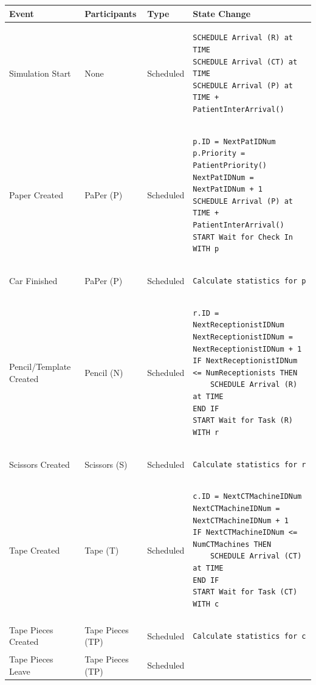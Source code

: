 \documentclass[
  10pt,
  a4paperpaper,
  DIV=11,
  numbers=noendperiod,
  oneside]{scrreprt}
\begin{document}
\begin{longtable}{@{}>{\raggedright\arraybackslash}p{1.5cm}>{\raggedright\arraybackslash}p{2.1cm}>{\raggedright\arraybackslash}p{2.2cm}>{\raggedright\arraybackslash}p{10cm}@{}}
  \toprule
  Event          & Participants & Type       & State Change \\ \midrule
  \endhead
  Simulation Start & None  & Scheduled  & 
  \begin{lstlisting}[language=CMPseudo]
SCHEDULE Arrival (R) at TIME
SCHEDULE Arrival (CT) at TIME
SCHEDULE Arrival (P) at TIME + PatientInterArrival()
  \end{lstlisting}
  \\ \midrule
  Paper Created & PaPer (P)  & Scheduled  & 
  \begin{lstlisting}[language=CMPseudo]
p.ID = NextPatIDNum
p.Priority = PatientPriority()
NextPatIDNum = NextPatIDNum + 1
SCHEDULE Arrival (P) at TIME + PatientInterArrival()
START Wait for Check In WITH p
  \end{lstlisting}
  \\ \midrule
  Car Finished & PaPer (P)  & Scheduled  & 
  \begin{lstlisting}[language=CMPseudo]
Calculate statistics for p
  \end{lstlisting}
  \\ \midrule
  Pencil/Template Created & Pencil (N)  & Scheduled  & 
  \begin{lstlisting}[language=CMPseudo]
r.ID = NextReceptionistIDNum
NextReceptionistIDNum = NextReceptionistIDNum + 1
IF NextReceptionistIDNum <= NumReceptionists THEN
    SCHEDULE Arrival (R) at TIME
END IF
START Wait for Task (R) WITH r
  \end{lstlisting}
  \\ \midrule
  Scissors Created & Scissors (S)  & Scheduled  & 
  \begin{lstlisting}[language=CMPseudo]
Calculate statistics for r
  \end{lstlisting}
  \\ \midrule
  Tape Created & Tape (T)  & Scheduled  & 
  \begin{lstlisting}[language=CMPseudo]
c.ID = NextCTMachineIDNum
NextCTMachineIDNum = NextCTMachineIDNum + 1
IF NextCTMachineIDNum <= NumCTMachines THEN
    SCHEDULE Arrival (CT) at TIME
END IF
START Wait for Task (CT) WITH c
  \end{lstlisting}
  \\ \midrule
  Tape Pieces Created & Tape Pieces (TP)  & Scheduled  & 
  \begin{lstlisting}[language=CMPseudo]
Calculate statistics for c
  \end{lstlisting}
  \\ \midrule
  Tape Pieces Leave & Tape Pieces (TP)  & Scheduled  & 

\end{longtable}
\end{document}
